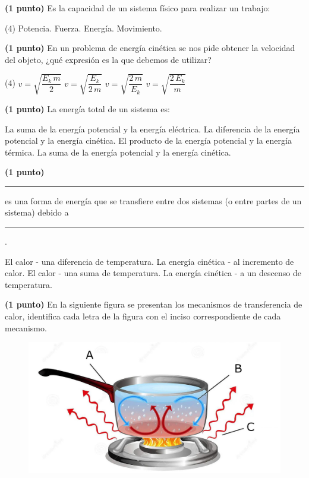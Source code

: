 \documentclass[12pt, letter]{exam}
\begin{document}
\begin{questions}
    \question \textbf{(1 punto)} Es la capacidad de un sistema físico para realizar un trabajo:
    \begin{tasks}(4)
        \task Potencia.
        \task Fuerza.
        \task Energía.
        \task Movimiento.
    \end{tasks}
    \question \textbf{(1 punto)} En un problema de energía cinética se nos pide obtener la velocidad del objeto, ¿qué expresión es la que debemos de utilizar?
    \begin{tasks}(4)
        \task $v = \sqrt{\dfrac{E_{k} \, m}{2}}$
        \task $v = \sqrt{\dfrac{E_{k}}{2 \, m}}$
        \task $v = \sqrt{\dfrac{2 \, m}{E_{k}}}$
        \task $v = \sqrt{\dfrac{2 \, E_{k}}{m}}$
    \end{tasks}
    \question \textbf{(1 punto)} La energía total de un sistema es:
    \begin{tasks}
        \task La suma de la energía potencial y la energía eléctrica.
        \task La diferencia de la energía potencial y la energía cinética.
        \task El producto de la energía potencial y la energía térmica.
        \task La suma de la energía potencial y la energía cinética.
    \end{tasks}
    \question \textbf{(1 punto)} \rule{2cm}{0.1mm} es una forma de energía que se transfiere entre dos sistemas (o entre partes de un sistema) debido a \rule{2cm}{0.1mm}.
    \begin{tasks}
        \task El calor - una diferencia de temperatura.
        \task La energía cinética - al incremento de calor.
        \task El calor - una suma de temperatura.
        \task La energía cinética - a un descenso de temperatura.
    \end{tasks}
    \question \textbf{(1 punto)} En la siguiente figura se presentan los mecanismos de transferencia de calor, identifica cada letra de la figura con el inciso correspondiente de cada mecanismo.
    \begin{figure}[H]
        \centering
        \includegraphics[scale=0.2]{Transferencia_Calor_01.jpg}

\end{figure}
\end{questions}
\end{document}
